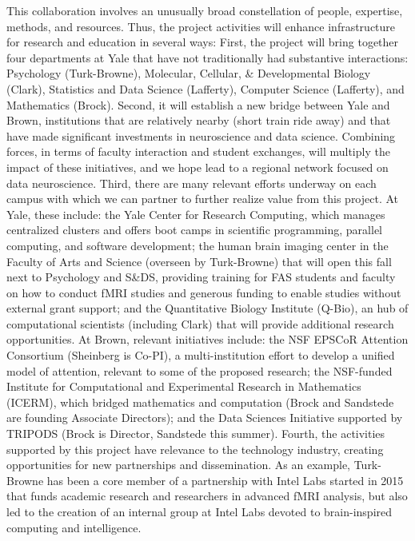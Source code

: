 This collaboration involves an unusually broad constellation of people,
expertise, methods, and resources. Thus, the project activities will
enhance infrastructure for research and education in several ways:
First, the project will bring together four departments at Yale that
have not traditionally had substantive interactions: Psychology
(Turk-Browne), Molecular, Cellular, \& Developmental Biology (Clark),
Statistics and Data Science (Lafferty), Computer Science (Lafferty), and Mathematics (Brock). 
Second, it will establish a
new bridge between Yale and Brown, institutions that are relatively
nearby (short train ride away) and that have made significant
investments in neuroscience and data science. Combining forces, in terms
of faculty interaction and student exchanges, will multiply the impact
of these initiatives, and we hope lead to a regional network focused on
data neuroscience. Third, there are many relevant efforts underway on
each campus with which we can partner to further realize value from this
project. At Yale, these include: the Yale Center for Research Computing,
which manages centralized clusters and offers boot camps in scientific
programming, parallel computing, and software development; the human
brain imaging center in the Faculty of Arts and Science (overseen by
Turk-Browne) that will open this fall next to Psychology and S\&DS,
providing training for FAS students and faculty on how to conduct fMRI
studies and generous funding to enable studies without external grant
support; and the Quantitative Biology Institute (Q-Bio), an hub of
computational scientists (including Clark) that will provide additional
research opportunities. At Brown, relevant initiatives include: the NSF
EPSCoR Attention Consortium (Sheinberg is Co-PI), a multi-institution
effort to develop a unified model of attention, relevant to some of the
proposed research; the NSF-funded Institute for Computational and
Experimental Research in Mathematics (ICERM), which bridged mathematics
and computation (Brock and Sandstede are founding Associate Directors);
and the Data Sciences Initiative supported by TRIPODS (Brock is
Director, Sandstede this summer). Fourth, the activities supported by
this project have relevance to the technology industry, creating
opportunities for new partnerships and dissemination. As an example,
Turk-Browne has been a core member of a partnership with Intel Labs
started in 2015 that funds academic research and researchers in advanced
fMRI analysis, but also led to the creation of an internal group at
Intel Labs devoted to brain-inspired computing and intelligence.

